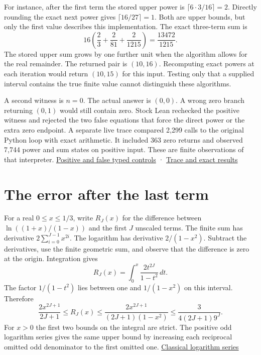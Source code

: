 For instance, after the first term the stored upper power is \(\lceil6\cdot3/16\rceil=2\). Directly rounding the exact next power gives \(\lceil16/27\rceil=1\). Both are upper bounds, but only the first value describes this implementation. The exact three-term sum is \[
16\left(\frac{2}{3}+\frac{2}{81}+\frac{2}{1215}\right)
=\frac{13472}{1215}.
\] The stored upper sum grows by one further unit when the algorithm allows for the real remainder. The returned pair is \((10,16)\). Recomputing exact powers at each iteration would return \((10,15)\) for this input. Testing only that a supplied interval contains the true finite value cannot distinguish these algorithms.

A second witness is \(n=0\). The actual answer is \((0,0)\). A wrong zero branch returning \((0,1)\) would still contain zero. Stock Lean rechecked the positive witness and rejected the two false equations that force the direct power or the extra zero endpoint. A separate live trace compared 2,299 calls to the original Python loop with exact arithmetic. It included 363 zero returns and observed 7,744 power and sum states on positive input. These are finite observations of that interpreter. \href{https://github.com/sepahead/pid-rs/blob/main/audit/research/signed-log-certificate-enclosure/typed-controls/Witness.lean}{Positive and false typed controls} · \href{https://github.com/sepahead/pid-rs/blob/main/audit/research/signed-log-certificate-enclosure/numerical/trace.json}{Trace and exact results}

\clearpage

\section{The error after the last term}\label{the-error-after-the-last-term}

For a real \(0\le x\le1/3\), write \(R_J(x)\) for the difference between \(\ln((1+x)/(1-x))\) and the first \(J\) unscaled terms. The finite sum has derivative \(2\sum_{i=0}^{J-1}x^{2i}\). The logarithm has derivative \(2/(1-x^2)\). Subtract the derivatives, use the finite geometric sum, and observe that the difference is zero at the origin. Integration gives \[
R_J(x)=\int_0^x\frac{2t^{2J}}{1-t^2}\,dt.
\] The factor \(1/(1-t^2)\) lies between one and \(1/(1-x^2)\) on this interval. Therefore \[
\frac{2x^{2J+1}}{2J+1}\le R_J(x)
\le\frac{2x^{2J+1}}{(2J+1)(1-x^2)}
\le\frac{3}{4(2J+1)9^J}.
\] For \(x>0\) the first two bounds on the integral are strict. The positive odd logarithm series gives the same upper bound by increasing each reciprocal omitted odd denominator to the first omitted one. \href{https://dlmf.nist.gov/4.6.E4}{Classical logarithm series}

